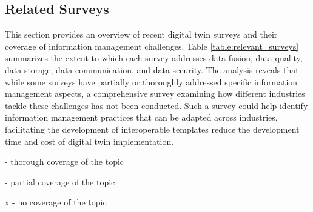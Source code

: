 \documentclass[conference]{IEEEtran}
\begin{document}
\subsection{Related Surveys}
This section provides an overview of recent digital twin surveys and their coverage of information management challenges. Table \ref{table:relevant_surveys} summarizes the extent to which each survey addresses data fusion, data quality, data storage, data communication, and data security. The analysis reveals that while some surveys have partially or thoroughly addressed specific information management aspects, a comprehensive survey examining how different industries tackle these challenges has not been conducted. Such a survey could help identify information management practices that can be adapted across industries, facilitating the development of interoperable templates reduce the development time and cost of digital twin implementation.

\checkmark\checkmark - thorough coverage of the topic

\checkmark - partial coverage of the topic

x - no coverage of the topic

\begin{table}[htbp]
    \centering
    \caption{An overview of digital twin surveys since 2022}
\end{table}
\end{document}
